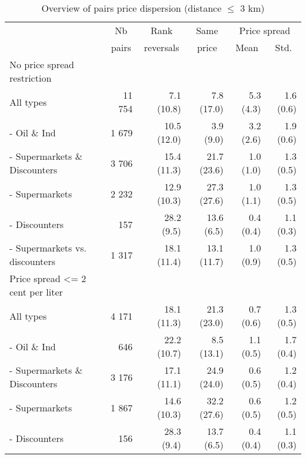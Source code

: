 \documentclass[english]{article}
\begin{document}
\begin{table}
\caption{Overview of pairs price dispersion (distance $\le$ 3 km)}
\label{tab:stats_pairs_3km}
\begin{threeparttable}
\begin{tabular}{lrrrrr}
    \toprule
    \toprule
          & \multicolumn{1}{c}{Nb} & \multicolumn{1}{c}{Rank} & \multicolumn{1}{c}{Same} & \multicolumn{2}{c}{Price spread} \\
          & \multicolumn{1}{c}{pairs} & \multicolumn{1}{c}{reversals} & \multicolumn{1}{c}{price} & \multicolumn{1}{c}{Mean} & \multicolumn{1}{c}{Std.} \\
    \midrule
    No price spread restriction &       &       &       &       &  \\
    All types & 11 754 & 7.1 (10.8) & 7.8 (17.0) & 5.3 (4.3) & 1.6 (0.6) \\
    - Oil \& Ind & 1 679 & 10.5 (12.0) & 3.9 \phantom{0}(9.0) & 3.2 (2.6) & 1.9 (0.6) \\
    - Supermarkets \& Discounters & 3 706 & 15.4 (11.3) & 21.7 (23.6) & 1.0 (1.0) & 1.3 (0.5) \\
    \hspace*{4mm} - Supermarkets & 2 232 & 12.9 (10.3) & 27.3 (27.6) & 1.0 (1.1) & 1.3 (0.5) \\
    \hspace*{4mm} - Discounters & 157   & 28.2 \phantom{0}(9.5) & 13.6 \phantom{0}(6.5) & 0.4 (0.4) & 1.1 (0.3) \\
    \hspace*{4mm} - Supermarkets vs. discounters & 1 317 & 18.1 (11.4) & 13.1 (11.7) & 1.0 (0.9) & 1.3 (0.5) \\
    \midrule
    Price spread <= 2 cent per liter &       &       &       &       &  \\
    All types & 4 171 & 18.1 (11.3) & 21.3 (23.0) & 0.7 (0.6) & 1.3 (0.5) \\
    - Oil \& Ind & 646   & 22.2 (10.7) & 8.5 (13.1) & 1.1 (0.5) & 1.7 (0.4) \\
    - Supermarkets \& Discounters & 3 176 & 17.1 (11.1) & 24.9 (24.0) & 0.6 (0.5) & 1.2 (0.4) \\
    \hspace*{4mm} - Supermarkets & 1 867 & 14.6 (10.3) & 32.2 (27.6) & 0.6 (0.5) & 1.2 (0.5) \\
    \hspace*{4mm} - Discounters & 156   & 28.3 \phantom{0}(9.4) & 13.7 \phantom{0}(6.5) & 0.4 (0.4) & 1.1 (0.3) \\

\end{tabular}
\end{threeparttable}
\end{table}
\end{document}
